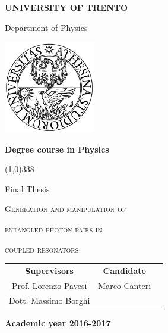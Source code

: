 \begin{titlepage}
  \pagestyle{empty}

  \begin{center}
    {\bfseries
      \Large {\huge U}NIVERSITY OF {\huge T}RENTO}

    \vspace{0.2cm}

    {\Large Department of Physics}

    \vspace{0.5cm}

    \begin{center}
      \includegraphics[width=0.3\textwidth]{img/logo_unitn.png}
    \end{center}

    \vspace{0.5cm}

    {\bfseries \Large Degree course in Physics}

    \vspace{0.3cm}
    \line(1,0){338}
    \vspace{0.3cm}

    {\Large Final Thesis}

    \vspace{2.5cm}

    {\huge \textsc{Generation and manipulation of}}

    \vspace{0.4cm}

    {\huge \textsc{entangled photon pairs in}}

     \vspace{0.4cm}

     {\huge \textsc{coupled resonators}}
    

    \vspace{3.0cm}


    \large
    \begin{center}
      \begin{tabular}{ccc}
        {\bfseries Supervisors} &
        \hspace{5cm}
        {\bfseries Candidate} \\

        Prof. Lorenzo Pavesi &
        \hspace{5cm} Marco Canteri \\
        Dott. Massimo Borghi


      \end{tabular}
    \end{center}
    \vspace{2cm}

    {\bfseries \large Academic year 2016-2017}
    \vfill
  \end{center}
\end{titlepage}
